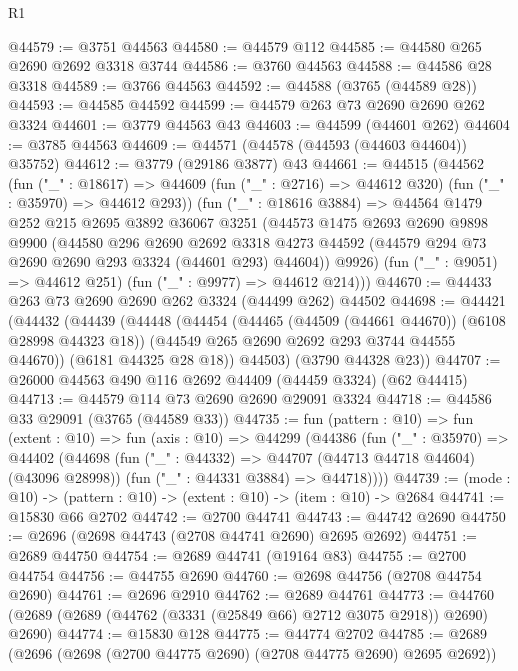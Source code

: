 \begin{lexlean}{R1}
\begin{coremodule}
@44579 := @3751 @44563
@44580 := @44579 @112
@44585 := @44580 @265 @2690 @2692 @3318 @3744
@44586 := @3760 @44563
@44588 := @44586 @28 @3318
@44589 := @3766 @44563
@44592 := @44588 (@3765 (@44589 @28))
@44593 := @44585 @44592
@44599 := @44579 @263 @73 @2690 @2690 @262 @3324
@44601 := @3779 @44563 @43
@44603 := @44599 (@44601 @262)
@44604 := @3785 @44563
@44609 := @44571 (@44578 (@44593 (@44603 @44604)) @35752)
@44612 := @3779 (@29186 @3877) @43
@44661 := @44515
    (@44562
      (fun ("_" : @18617) =>
      @44609 (fun ("_" : @2716) => @44612 @320) (fun ("_" : @35970) => @44612 @293))
      (fun ("_" : @18616 @3884) =>
      @44564
        @1479
        @252
        @215
        @2695
        @3892
        @36067
        @3251
        (@44573
          @1475
          @2693
          @2690
          @9898
          @9900
          (@44580
            @296
            @2690
            @2692
            @3318
            @4273
            @44592
            (@44579 @294 @73 @2690 @2690 @293 @3324 (@44601 @293) @44604))
          @9926)
        (fun ("_" : @9051) => @44612 @251)
        (fun ("_" : @9977) => @44612 @214)))
@44670 := @44433 @263 @73 @2690 @2690 @262 @3324 (@44499 @262) @44502
@44698 := @44421
    (@44432
      (@44439
        (@44448
          (@44454
            (@44465 (@44509 (@44661 @44670)) (@6108 @28998 @44323 @18))
            (@44549 @265 @2690 @2692 @293 @3744 @44555 @44670))
          (@6181 @44325 @28 @18))
        @44503)
      (@3790 @44328 @23))
@44707 := @26000 @44563 @490 @116 @2692 @44409 (@44459 @3324) (@62 @44415)
@44713 := @44579 @114 @73 @2690 @2690 @29091 @3324
@44718 := @44586 @33 @29091 (@3765 (@44589 @33))
@44735 := fun (pattern : @10) =>
  fun (extent : @10) =>
  fun (axis : @10) =>
  @44299
    (@44386
      (fun ("_" : @35970) =>
      @44402
        (@44698
          (fun ("_" : @44332) => @44707 (@44713 @44718 @44604) (@43096 @28998))
          (fun ("_" : @44331 @3884) => @44718))))
@44739 := (mode : @10) -> (pattern : @10) -> (extent : @10) -> (item : @10) -> @2684
@44741 := @15830 @66 @2702
@44742 := @2700 @44741
@44743 := @44742 @2690
@44750 := @2696 (@2698 @44743 (@2708 @44741 @2690) @2695 @2692)
@44751 := @2689 @44750
@44754 := @2689 @44741 (@19164 @83)
@44755 := @2700 @44754
@44756 := @44755 @2690
@44760 := @2698 @44756 (@2708 @44754 @2690)
@44761 := @2696 @2910
@44762 := @2689 @44761
@44773 := @44760 (@2689 (@2689 (@44762 (@3331 (@25849 @66) @2712 @3075 @2918)) @2690) @2690)
@44774 := @15830 @128
@44775 := @44774 @2702
@44785 := @2689 (@2696 (@2698 (@2700 @44775 @2690) (@2708 @44775 @2690) @2695 @2692))

\end{coremodule}
\end{lexlean}
